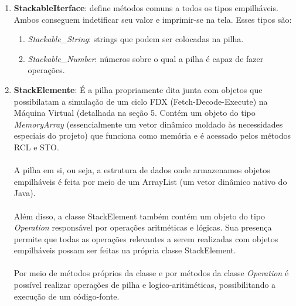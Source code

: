 \documentclass[a4paper]{article}
\begin{document}
\begin{enumerate}
\item \textbf{StackableIterface}: define métodos comuns a todos os tipos empilháveis. Ambos conseguem indetificar seu valor e imprimir-se na tela. Esses tipos são:

\begin{enumerate}
\item \textit{Stackable\_String}: strings que podem ser colocadas na pilha.
\item \textit{Stackable\_Number}: números sobre o qual a pilha é capaz de fazer operações.
\end{enumerate}
\item \textbf{StackElemente}: É a pilha propriamente dita junta com objetos que possibilatam a simulação de um ciclo FDX (Fetch-Decode-Execute) na Máquina Virtual (detalhada na seção 5. Contém um objeto do tipo \textit{MemoryArray} (essencialmente um vetor dinâmico moldado às necessidades especiais do projeto) que funciona como memória e é acessado pelos métodos RCL e STO.\\\\
A pilha em si, ou seja, a estrutura de dados onde armazenamos objetos empilháveis é feita por meio de um ArrayList (um vetor dinâmico nativo do Java).\\\\
Além disso, a classe StackElement também contém um objeto do tipo \textit{Operation} responsável por operações aritméticas e lógicas. Sua presença permite que todas as operações relevantes a serem realizadas com objetos empilháveis possam ser feitas na própria classe StackElement.\\\\
Por meio de métodos próprios da classe e por métodos da classe \textit{Operation} é possível realizar operações de pilha e logico-aritiméticas, possibilitando a execução de um código-fonte.
\end{enumerate}
    
\newpage
\end{document}
